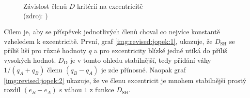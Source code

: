\begin{figure}[ht]
    \centering
    \hfill
    \caption[Závislost členů $D$-kritérií na excentricitě]{
        Závislost členů $D$-kritérií na excentricitě\\
        {\small (zdroj: \cite{remarks})}
    }
    \label{img:revised:jopek}
\end{figure}

Cílem je, aby se příspěvek jednotlivých členů choval co nejvíce konstantě vzheledem k excentricitě. První, graf \ref{img:revised:jopek:1}, ukazuje, že $D_\text{SH}$ se příliš liší pro různé hodnoty $q$ a pro excentricity blízké jedné utíká do příliš vysokých hodnot. $D_\text{D}$ je v tomto ohledu stabilnější, tedy přidání váhy $1/(q_A+q_B)$ členu $(q_B-q_A)$ je zde přínosné. Naopak graf \ref{img:revised:jopek:2} ukazuje, že ve členu excentricit je mnohem stabilnější prostý rozdíl $(e_B-e_A)$ s váhou $1$ z funkce $D_\text{SH}$.

\medskip

